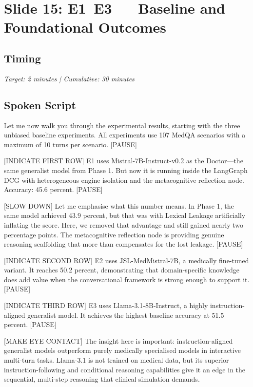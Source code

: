

\section{Slide 15: E1--E3 --- Baseline and Foundational Outcomes}

\subsection*{Timing}
\textit{Target: 2 minutes | Cumulative: 30 minutes}

\subsection*{Spoken Script}
\begin{spokenbox}
 Let me now walk you through the experimental results, starting with the three unbiased baseline experiments. All experiments use 107 MedQA scenarios with a maximum of 10 turns per scenario. [PAUSE]

[INDICATE FIRST ROW] E1 uses Mistral-7B-Instruct-v0.2 as the Doctor---the same generalist model from Phase 1. But now it is running inside the LangGraph DCG with heterogeneous engine isolation and the metacognitive reflection node. Accuracy: 45.6 percent. [PAUSE]

[SLOW DOWN] Let me emphasise what this number means. In Phase 1, the same model achieved 43.9 percent, but that was with Lexical Leakage artificially inflating the score. Here, we removed that advantage and still gained nearly two percentage points. The metacognitive reflection node is providing genuine reasoning scaffolding that more than compensates for the lost leakage. [PAUSE]

[INDICATE SECOND ROW] E2 uses JSL-MedMistral-7B, a medically fine-tuned variant. It reaches 50.2 percent, demonstrating that domain-specific knowledge does add value when the conversational framework is strong enough to support it. [PAUSE]

[INDICATE THIRD ROW] E3 uses Llama-3.1-8B-Instruct, a highly instruction-aligned generalist model. It achieves the highest baseline accuracy at 51.5 percent. [PAUSE]

[MAKE EYE CONTACT] The insight here is important: instruction-aligned generalist models outperform purely medically specialised models in interactive multi-turn tasks. Llama-3.1 is not trained on medical data, but its superior instruction-following and conditional reasoning capabilities give it an edge in the sequential, multi-step reasoning that clinical simulation demands.
\end{spokenbox}

